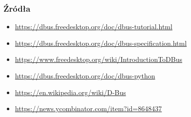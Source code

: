 


\begin{frame}
    \frametitle{Źródła}
    \begin{itemize}
        \item     \href{https://dbus.freedesktop.org/doc/dbus-tutorial.html}{https://dbus.freedesktop.org/doc/dbus-tutorial.html}
        \item     \href{https://dbus.freedesktop.org/doc/dbus-specification.html}{https://dbus.freedesktop.org/doc/dbus-specification.html}
        \item     \href{https://www.freedesktop.org/wiki/IntroductionToDBus/}{https://www.freedesktop.org/wiki/IntroductionToDBus}
        \item     \href{https://dbus.freedesktop.org/doc/dbus-python/}{https://dbus.freedesktop.org/doc/dbus-python}
        \item     \href{https://en.wikipedia.org/wiki/D-Bus}{https://en.wikipedia.org/wiki/D-Bus}
        \item     \href{https://news.ycombinator.com/item?id=8648437}{https://news.ycombinator.com/item?id=8648437}
    \end{itemize}
\end{frame}
